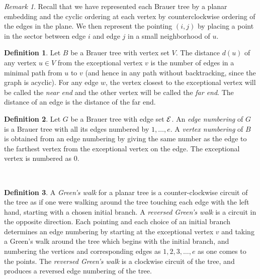 \documentclass[11pt,english]{article}
\numberwithin{figure}{section}
\numberwithin{equation}{section}
\numberwithin{table}{section}
\theoremstyle{definition}
\newtheorem{defn}{Definition}[section]
\theoremstyle{remark}
\newtheorem{remark}{Remark}[section]
\begin{document}
\noindent \begin{remark}Recall that we have represented each Brauer
	tree by a planar embedding and the cyclic ordering at each vertex
	by counterclockwise ordering of the edges in the plane. We then represent
	the pointing $(i,j)$ by placing a point in the sector between edge
	$i$ and edge $j$ in a small neighborhood of $u$.\end{remark}

\noindent \begin{defn} Let $B$ be a Brauer tree with vertex set $V$.
	The distance $d(u)$ of any vertex $u\in V$ from the exceptional
	vertex $v$ is the number of edges in a minimal path from $u$
	to $v$ (and hence in any path without backtracking, since the
	graph is acyclic). For any edge $w$, the vertex closest to the exceptional 
	vertex will be called the \textit{near end} and the other vertex 
	will be called the \textit{far end}. The distance of an edge is the distance of the far
	end. 
\end{defn}

\noindent \begin{defn}Let $G$ be a Brauer tree with edge set $\ensuremath{{\cal E}}$.
	An \textit{edge numbering} of $G$ is a Brauer tree with all its edges
	numbered by $1,\ldots,e$. A \textit{vertex numbering} of $B$ is obtained
	from an edge numbering by giving the same number as the edge to the
	farthest vertex from the exceptional vertex on the edge. The exceptional
	vertex is numbered as 0.\end{defn}

~


\noindent \begin{defn}  A\textit{
		Green's walk} for a planar tree is a counter-clockwise circuit of the
	tree as if one were walking around the tree touching each edge with
	the left hand, starting with a chosen initial branch. A \textit{reversed Green's walk} 
	is a circuit in the opposite direction. Each pointing 
	and each choice of an initial branch determines an
	edge numbering  by starting at the exceptional vertex $v$
	and taking a Green's walk around the tree which begins with the initial branch, 
	and numbering the vertices and corresponding edges as $1, 2, 3,\dots, e$
	as one comes to the points. The \textit{reversed Green's walk} is a clockwise circuit of the tree, and produces a reversed edge numbering of the tree. \end{defn}
\end{document}
